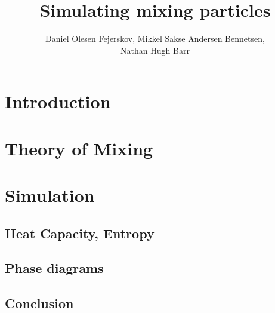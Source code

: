 \documentclass[12pt,a4paper]{report}
\begin{document}
\title{Simulating mixing particles}
\author{Daniel Olesen Fejerskov, Mikkel Sakse Andersen Bennetsen, \\ Nathan Hugh Barr}
\maketitle
\tableofcontents

\chapter{Introduction}


\chapter{Theory of Mixing}


\chapter{Simulation}


\section{Heat Capacity, Entropy}






\section{Phase diagrams}


\section{Conclusion}
\end{document}
